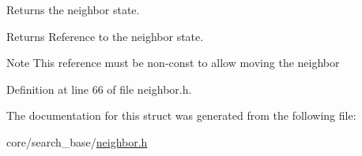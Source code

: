 Returns the neighbor state. 

\begin{DoxyReturn}{Returns}
Reference to the neighbor state. 
\end{DoxyReturn}
\begin{DoxyNote}{Note}
This reference must be non-\/const to allow moving the neighbor 
\end{DoxyNote}


Definition at line 66 of file neighbor.\+h.



The documentation for this struct was generated from the following file\+:\begin{DoxyCompactItemize}
\item 
core/search\+\_\+base/\hyperlink{neighbor_8h}{neighbor.\+h}\end{DoxyCompactItemize}
